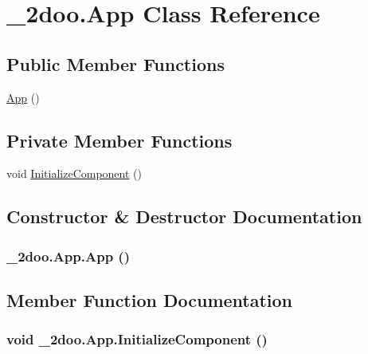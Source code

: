 \hypertarget{class__2doo_1_1_app}{
\section{\_\-2doo.App Class Reference}
\label{class__2doo_1_1_app}
}
\subsection*{Public Member Functions}
\begin{CompactItemize}
\item 
\hyperlink{class__2doo_1_1_app_0ccca886d08e86c036545a6a8e64670c}{App} ()
\end{CompactItemize}
\subsection*{Private Member Functions}
\begin{CompactItemize}
\item 
void \hyperlink{class__2doo_1_1_app_d8fbace2b0dc0bb67a3ff139c631b2e0}{InitializeComponent} ()
\end{CompactItemize}


\subsection{Constructor \& Destructor Documentation}
\hypertarget{class__2doo_1_1_app_0ccca886d08e86c036545a6a8e64670c}{
\subsubsection[{App}]{\setlength{\rightskip}{0pt plus 5cm}\_\-2doo.App.App ()}}
\label{class__2doo_1_1_app_0ccca886d08e86c036545a6a8e64670c}




\subsection{Member Function Documentation}
\hypertarget{class__2doo_1_1_app_d8fbace2b0dc0bb67a3ff139c631b2e0}{
\subsubsection[{InitializeComponent}]{\setlength{\rightskip}{0pt plus 5cm}void \_\-2doo.App.InitializeComponent ()}}
\label{class__2doo_1_1_app_d8fbace2b0dc0bb67a3ff139c631b2e0}




